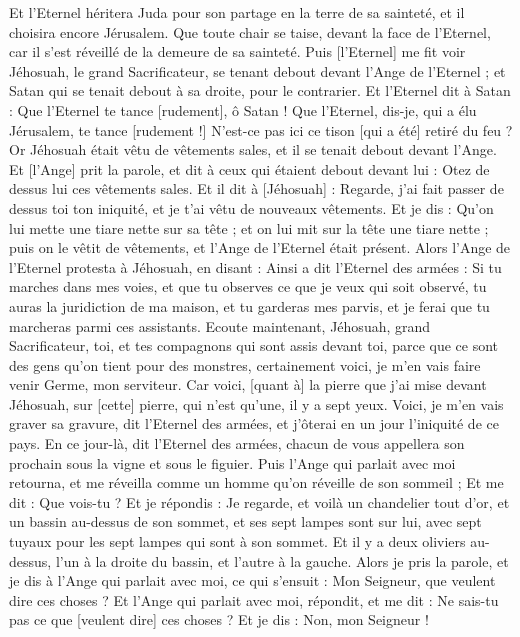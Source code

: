 \begin{multicols}{2}
Et l'Eternel héritera Juda pour son partage en la terre de sa sainteté, et il choisira encore Jérusalem.
Que toute chair se taise, devant la face de l'Eternel, car il s'est réveillé de la demeure de sa sainteté.
\VerseOne{}Puis [l'Eternel] me fit voir Jéhosuah, le grand Sacrificateur, se tenant debout devant l'Ange de l'Eternel ; et Satan qui se tenait debout à sa droite, pour le contrarier.
Et l'Eternel dit à Satan : Que l'Eternel te tance [rudement], ô Satan ! Que l'Eternel, dis-je, qui a élu Jérusalem, te tance [rudement !] N'est-ce pas ici ce tison [qui a été] retiré du feu ?
Or Jéhosuah était vêtu de vêtements sales, et il se tenait debout devant l'Ange.
Et [l’Ange] prit la parole, et dit à ceux qui étaient debout devant lui : Otez de dessus lui ces vêtements sales. Et il dit à [Jéhosuah] : Regarde, j'ai fait passer de dessus toi ton iniquité, et je t'ai vêtu de nouveaux vêtements.
Et je dis : Qu'on lui mette une tiare nette sur sa tête ; et on lui mit sur la tête une tiare nette ; puis on le vêtit de vêtements, et l'Ange de l'Eternel était présent.
Alors l'Ange de l'Eternel protesta à Jéhosuah, en disant :
Ainsi a dit l'Eternel des armées : Si tu marches dans mes voies, et que tu observes ce que je veux qui soit observé, tu auras la juridiction de ma maison, et tu garderas mes parvis, et je ferai que tu marcheras parmi ces assistants.
Ecoute maintenant, Jéhosuah, grand Sacrificateur, toi, et tes compagnons qui sont assis devant toi, parce que ce sont des gens qu'on tient pour des monstres, certainement voici, je m'en vais faire venir Germe, mon serviteur.
Car voici, [quant à] la pierre que j'ai mise devant Jéhosuah, sur [cette] pierre, qui n'est qu'une, il y a sept yeux. Voici, je m'en vais graver sa gravure, dit l'Eternel des armées, et j'ôterai en un jour l'iniquité de ce pays.
En ce jour-là, dit l'Eternel des armées, chacun de vous appellera son prochain sous la vigne et sous le figuier.
\VerseOne{}Puis l'Ange qui parlait avec moi retourna, et me réveilla comme un homme qu'on réveille de son sommeil ;
Et me dit : Que vois-tu ? Et je répondis : Je regarde, et voilà un chandelier tout d'or, et un bassin au-dessus de son sommet, et ses sept lampes sont sur lui, avec sept tuyaux pour les sept lampes qui sont à son sommet.
Et il y a deux oliviers au-dessus, l'un à la droite du bassin, et l'autre à la gauche.
Alors je pris la parole, et je dis à l'Ange qui parlait avec moi, ce qui s'ensuit : Mon Seigneur, que veulent dire ces choses ?
Et l'Ange qui parlait avec moi, répondit, et me dit : Ne sais-tu pas ce que [veulent dire] ces choses ? Et je dis : Non, mon Seigneur !

\end{multicols}
